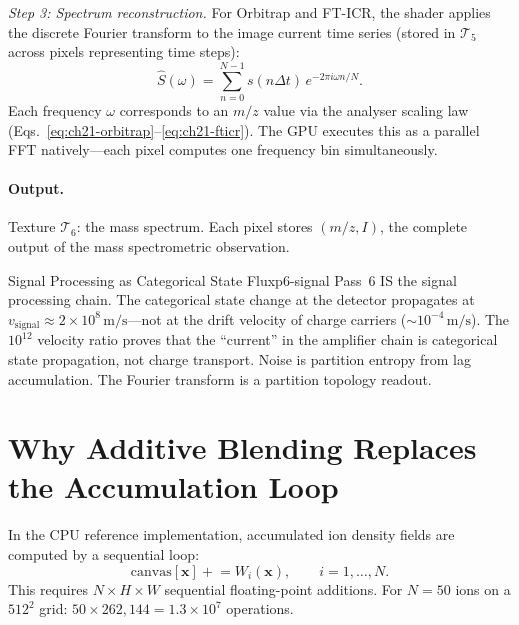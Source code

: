 \textit{Step 3: Spectrum reconstruction.}
For Orbitrap and FT-ICR, the shader applies the discrete Fourier transform
to the image current time series (stored in $\mathcal{T}_5$ across pixels
representing time steps):
\begin{equation}
  \hat{S}(\omega) = \sum_{n=0}^{N-1} s(n\Delta t)\,e^{-2\pi i \omega n/N}.
\end{equation}
Each frequency $\omega$ corresponds to an $m/z$ value via the analyser
scaling law (Eqs.~\eqref{eq:ch21-orbitrap}--\eqref{eq:ch21-fticr}).  The
GPU executes this as a parallel FFT natively---each pixel computes one
frequency bin simultaneously.

\paragraph{Output.}
Texture $\mathcal{T}_6$: the mass spectrum.  Each pixel stores $(m/z, I)$,
the complete output of the mass spectrometric observation.

\begin{consequence}{Signal Processing as Categorical State Flux}{p6-signal}
  Pass~6 IS the signal processing chain.  The categorical state change at
  the detector propagates at $v_{\mathrm{signal}} \approx 2\times 10^8
  \,\mathrm{m/s}$---not at the drift velocity of charge carriers
  (${\sim}10^{-4}\,\mathrm{m/s}$).  The $10^{12}$ velocity ratio proves
  that the ``current'' in the amplifier chain is categorical state
  propagation, not charge transport.  Noise is partition entropy from lag
  accumulation.  The Fourier transform is a partition topology readout.
\end{consequence}

\section{Why Additive Blending Replaces the Accumulation Loop}
\label{sec:ch22-blending}

In the CPU reference implementation, accumulated ion density fields are computed
by a sequential loop:
\begin{equation}
  \mathrm{canvas}[\mathbf{x}] \mathrel{+}= W_i(\mathbf{x}), \qquad
  i = 1, \ldots, N.
\end{equation}
This requires $N\times H\times W$ sequential floating-point additions.
For $N = 50$ ions on a $512^2$ grid: $50 \times 262{,}144 = 1.3\times 10^7$
operations.

